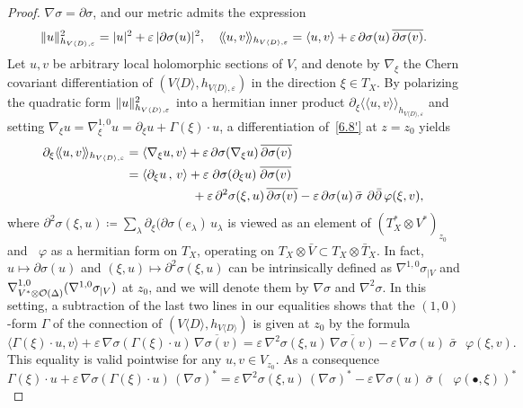 \documentclass[10pt,a4paper]{article}
\DeclareMathOperator{\ddbar}{\partial\bar\partial}
\DeclarePairedDelimiter{\abs}{\lvert}{\rvert}
\DeclarePairedDelimiter{\Abs}{\lVert}{\rVert}
\newcommand*\cO{\mathcal{O}}
\newcommand*\bydef{\coloneqq}
\numberwithin{equation}{section}
\begin{document}
\begin{proof}
$\nabla\sigma=\partial\sigma$, and our metric admits the expression
\[
\Abs{u}_{h_{V\langle D\rangle,\varepsilon}}^2=
\abs{u}^2+\varepsilon\,\abs{\partial\sigma(u)}^2,\quad
\langle\!\langle u,v\rangle\!\rangle_{h_{V\langle D\rangle,\varepsilon}}=
\langle u,v\rangle+\varepsilon\,\partial\sigma(u)\,
\overline{\partial\sigma(v)}.
\]
Let $u,v$ be arbitrary local holomorphic sections of $V$, and denote by
$\nabla_\xi$ the Chern covariant differentiation of $(V\langle D\rangle,h_{V\langle D\rangle,\varepsilon})$ in the direction
$\xi\in T_X$. By polarizing the quadratic form
$\Abs{u}_{h_{V\langle D\rangle,\varepsilon}}^2$ into a hermitian inner product
$\partial_\xi\langle\!\langle u,v
\rangle\!\rangle_{h_{V\langle D\rangle,\varepsilon}}$ and setting $\nabla_\xi u=
\nabla^{1,0}_\xi u=\partial_\xi u+\Gamma(\xi)\cdot u$, a differentiation of~\eqref{6.8'} at $z=z_0$ yields
\begin{align*}
\partial_\xi\langle\!\langle u,v
\rangle\!\rangle_{h_{V\langle D\rangle,\varepsilon}} &=
\langle\nabla_\xi u,v\rangle+\varepsilon\,
\partial\sigma(\nabla_\xi u)\,\overline{\partial\sigma(v)}
\\
&=
\langle\partial_\xi u\,,\,v\rangle+\varepsilon\;
\partial\sigma(\partial_\xi u)\;\overline{\partial\sigma(v)}
\\
&\phantom{=}\hspace{3\parindent} +\varepsilon\,\partial^2\sigma(\xi,u)\,\overline{\partial\sigma(v)} -\varepsilon\,
\partial\sigma(u)\,\bar \sigma\,\ddbar\varphi(\xi,v),
\end{align*}
where $\partial^2\sigma(\xi,u)\bydef\sum_\lambda\partial_\xi(\partial\sigma (e_\lambda)\,u_\lambda$ is viewed as an element of
$(T_X^*\otimes V^*)_{z_0}$ and $\ddbar\varphi$ as a hermitian form on $T_X$, operating on $T_X\otimes\bar V\subset T_X\otimes \bar T_X$. In fact,
$u\mapsto\partial\sigma(u)$ and $(\xi,u)\mapsto\partial^2\sigma(\xi,u)$ can be intrinsically defined as $\nabla^{1,0}\sigma_{|V}$ and
$\smash{\nabla_{V^*\otimes \cO(\Delta)}^{1,0}}(\nabla^{1,0}\sigma_{|V})$ at $z_0$, and we will denote them by $\nabla\sigma$ and $\nabla^2\sigma$. In this setting, a subtraction of the last two lines in our equalities shows that the $(1,0)$-form $\Gamma$ of the connection of $(V\langle D\rangle,h_{V\langle D\rangle})$ is given at $z_0$ by the formula
\begin{equation}\label{6.10}
\langle \Gamma(\xi)\cdot u,v\rangle +\varepsilon\,
\nabla\sigma(\Gamma(\xi)\cdot u)\,\overline{\nabla\sigma(v)} =\varepsilon\,
\nabla^2\sigma(\xi,u)\,\overline{\nabla\sigma(v)} -\varepsilon\,\nabla\sigma(u)\;\bar\sigma\,\ddbar\varphi(\xi,v).
\end{equation}
This equality is valid pointwise for any $u,v\in V_{z_0}$. As a consequence
\begin{equation}\label{6.11}
\Gamma(\xi)\cdot u+\varepsilon\,
\nabla\sigma(\Gamma(\xi)\cdot u)\,(\nabla\sigma)^* =\varepsilon\,
\nabla^2\sigma(\xi,u)\,(\nabla\sigma)^* -\varepsilon\,\nabla\sigma(u)\;\bar\sigma\, (\ddbar\varphi(\bullet,\xi))^*
\end{equation}


\end{proof}
\end{document}
